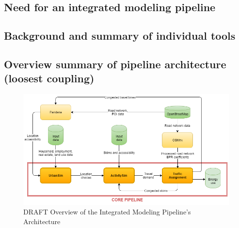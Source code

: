 \subsection{Need for an integrated modeling pipeline}

\subsection{Background and summary of individual tools}

\subsection{Overview summary of pipeline architecture (loosest coupling)}

\begin{figure}[htp]
\center
\includegraphics[width=6.5in]
{graphics/diagram_pipeline.png}
\caption{DRAFT Overview of the Integrated Modeling Pipeline's Architecture}
\label{fig:overview_pipeline_architecture}
\end{figure}




